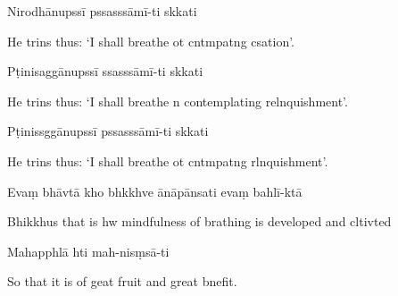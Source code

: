 Nirodhānupssī pssasssāmī-ti skkati

\begin{english}
  He trins thus: `I shall breathe ot cntmpatng csation'.
\end{english}

Pṭinisaggānupssī ssasssāmī-ti skkati

\begin{english}
  He trins thus: `I shall breathe n contemplating relnquishment'.
\end{english}

Pṭinissggānupssī pssasssāmī-ti skkati

\begin{english}
  He trins thus: `I shall breathe ot cntmpatng rlnquishment'.
\end{english}

Evaṃ bhāvtā kho bhkkhve ānāpānsati evaṃ bahlī-ktā


\begin{english}
  Bhikkhus that is hw mindfulness of brathing is developed and cltivted
\end{english}

Mahapphlā hti mah-nisṃsā-ti

\begin{english}
  So that it is of geat fruit and great bnefit.
\end{english}


